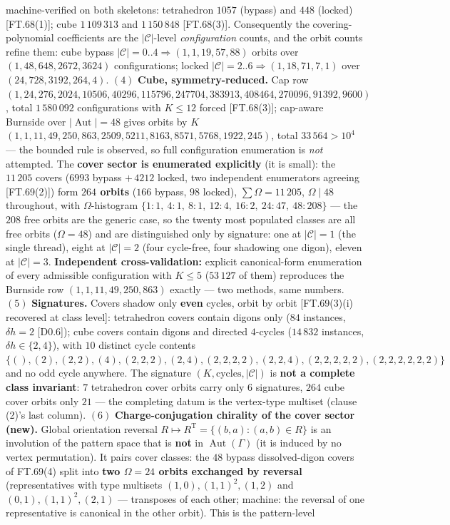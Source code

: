 \begin{theorem}
machine-verified on both skeletons: tetrahedron $1057$ (bypass) and $448$ (locked) [FT.68(1)]; cube $1\,109\,313$ and $1\,150\,848$ [FT.68(3)]. Consequently the covering-polynomial coefficients are the $|\mathcal C|$-level \textit{configuration} counts, and the orbit counts refine them: cube bypass $|\mathcal C|=0..4\Rightarrow(1,1,19,57,88)$ orbits over $(1,48,648,2672,3624)$ configurations; locked $|\mathcal C|=2..6\Rightarrow(1,18,71,7,1)$ over $(24,728,3192,264,4)$. $(4)$ \textbf{Cube, symmetry-reduced.} Cap row $(1,24,276,2024,10506,40296,115796,247704,383913,408464,270096,91392,9600)$, total $1\,580\,092$ configurations with $K\le12$ forced [FT.68(3)]; cap-aware Burnside over $|\operatorname{Aut}|=48$ gives orbits by $K$ $(1,1,11,49,250,863,2509,5211,8163,8571,5768,1922,245)$, total $33\,564>10^4$ — the bounded rule is observed, so full configuration enumeration is \textit{not} attempted. The \textbf{cover sector is enumerated explicitly} (it is small): the $11\,205$ covers ($6993$ bypass $+\,4212$ locked, two independent enumerators agreeing [FT.69(2)]) form \textbf{$264$ orbits} ($166$ bypass, $98$ locked), $\sum\Omega=11\,205$, $\Omega\mid48$ throughout, with $\Omega$-histogram $\{1{:}1,\ 4{:}1,\ 8{:}1,\ 12{:}4,\ 16{:}2,\ 24{:}47,\ 48{:}208\}$ — the $208$ free orbits are the generic case, so the twenty most populated classes are all free orbits ($\Omega=48$) and are distinguished only by signature: one at $|\mathcal C|=1$ (the single thread), eight at $|\mathcal C|=2$ (four cycle-free, four shadowing one digon), eleven at $|\mathcal C|=3$. \textbf{Independent cross-validation:} explicit canonical-form enumeration of every admissible configuration with $K\le5$ ($53\,127$ of them) reproduces the Burnside row $(1,1,11,49,250,863)$ exactly — two methods, same numbers. $(5)$ \textbf{Signatures.} Covers shadow only \textbf{even} cycles, orbit by orbit [FT.69(3)(i) recovered at class level]: tetrahedron covers contain digons only ($84$ instances, $\delta h=2$ [D0.6]); cube covers contain digons and directed $4$-cycles ($14\,832$ instances, $\delta h\in\{2,4\}$), with $10$ distinct cycle contents $\{(),(2),(2,2),(4),(2,2,2),(2,4),(2,2,2,2),(2,2,4),(2,2,2,2,2),(2,2,2,2,2,2)\}$ and no odd cycle anywhere. The signature $(K,\text{cycles},|\mathcal C|)$ is \textbf{not a complete class invariant}: $7$ tetrahedron cover orbits carry only $6$ signatures, $264$ cube cover orbits only $21$ — the completing datum is the vertex-type multiset (clause (2)'s last column). $(6)$ \textbf{Charge-conjugation chirality of the cover sector (new).} Global orientation reversal $R\mapsto R^{\mathrm T}=\{(b,a):(a,b)\in R\}$ is an involution of the pattern space that is \textbf{not} in $\operatorname{Aut}(\Gamma)$ (it is induced by no vertex permutation). It pairs cover classes: the $48$ bypass dissolved-digon covers of FT.69(4) split into \textbf{two $\Omega=24$ orbits exchanged by reversal} (representatives with type multisets $(1,0),(1,1)^2,(1,2)$ and $(0,1),(1,1)^2,(2,1)$ — transposes of each other; machine: the reversal of one representative is canonical in the other orbit). This is the pattern-level 
\end{theorem}
